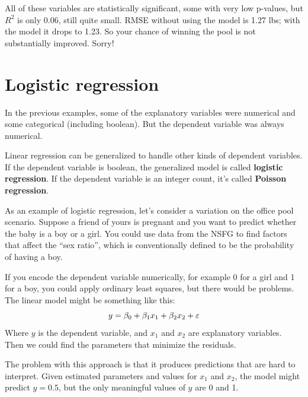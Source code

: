 \documentclass[12pt]{book}
\begin{document}
All of these variables are statistically significant, some with
very low p-values, but 
$R^2$ is only 0.06, still quite small.
RMSE without using the model is 1.27 lbs; with the model it drops
to 1.23.  So your chance of winning the pool is not substantially
improved.  Sorry!
   



\section{Logistic regression}

In the previous examples, some of the explanatory variables were
numerical and some categorical (including boolean).  But the dependent
variable was always numerical.

Linear regression can be generalized to handle other kinds of
dependent variables.  If the dependent variable is boolean, the
generalized model is called {\bf logistic regression}.  If the dependent
variable is an integer count, it's called {\bf Poisson
regression}.

As an example of logistic regression, let's consider a variation
on the office pool scenario.
Suppose
a friend of yours is pregnant and you want to predict whether the
baby is a boy or a girl.  You could use data from the NSFG to find
factors that affect the ``sex ratio'', which is conventionally
defined to be the probability
of having a boy.

If you encode the dependent variable numerically, for example 0 for a
girl and 1 for a boy, you could apply ordinary least squares, but
there would be problems.  The linear model might be something like
this:
%
\[ y = \beta_0 + \beta_1 x_1 + \beta_2 x_2 + \varepsilon \]
%
Where $y$ is the dependent variable, and $x_1$ and $x_2$ are
explanatory variables.  Then we could find the parameters that
minimize the residuals.

The problem with this approach is that it produces predictions that
are hard to interpret.  Given estimated parameters and values for
$x_1$ and $x_2$, the model might predict $y=0.5$, but the only
meaningful values of $y$ are 0 and 1.
\end{document}
